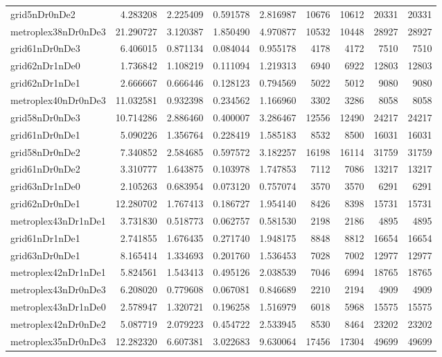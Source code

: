 \begin{longtable}{|l|r|r|r|r|r|r|r|r|}
grid5nDr0nDe2 & 4.283208 & 2.225409 & 0.591578 & 2.816987 & 10676 & 10612 & 20331 & 20331 \\
metroplex38nDr0nDe3 & 21.290727 & 3.120387 & 1.850490 & 4.970877 & 10532 & 10448 & 28927 & 28927 \\
grid61nDr0nDe3 & 6.406015 & 0.871134 & 0.084044 & 0.955178 & 4178 & 4172 & 7510 & 7510 \\
grid62nDr1nDe0 & 1.736842 & 1.108219 & 0.111094 & 1.219313 & 6940 & 6922 & 12803 & 12803 \\
grid62nDr1nDe1 & 2.666667 & 0.666446 & 0.128123 & 0.794569 & 5022 & 5012 & 9080 & 9080 \\
metroplex40nDr0nDe3 & 11.032581 & 0.932398 & 0.234562 & 1.166960 & 3302 & 3286 & 8058 & 8058 \\
grid58nDr0nDe3 & 10.714286 & 2.886460 & 0.400007 & 3.286467 & 12556 & 12490 & 24217 & 24217 \\
grid61nDr0nDe1 & 5.090226 & 1.356764 & 0.228419 & 1.585183 & 8532 & 8500 & 16031 & 16031 \\
grid58nDr0nDe2 & 7.340852 & 2.584685 & 0.597572 & 3.182257 & 16198 & 16114 & 31759 & 31759 \\
grid61nDr0nDe2 & 3.310777 & 1.643875 & 0.103978 & 1.747853 & 7112 & 7086 & 13217 & 13217 \\
grid63nDr1nDe0 & 2.105263 & 0.683954 & 0.073120 & 0.757074 & 3570 & 3570 & 6291 & 6291 \\
grid62nDr0nDe1 & 12.280702 & 1.767413 & 0.186727 & 1.954140 & 8426 & 8398 & 15731 & 15731 \\
metroplex43nDr1nDe1 & 3.731830 & 0.518773 & 0.062757 & 0.581530 & 2198 & 2186 & 4895 & 4895 \\
grid61nDr1nDe1 & 2.741855 & 1.676435 & 0.271740 & 1.948175 & 8848 & 8812 & 16654 & 16654 \\
grid63nDr0nDe1 & 8.165414 & 1.334693 & 0.201760 & 1.536453 & 7028 & 7002 & 12977 & 12977 \\
metroplex42nDr1nDe1 & 5.824561 & 1.543413 & 0.495126 & 2.038539 & 7046 & 6994 & 18765 & 18765 \\
metroplex43nDr0nDe3 & 6.208020 & 0.779608 & 0.067081 & 0.846689 & 2210 & 2194 & 4909 & 4909 \\
metroplex43nDr1nDe0 & 2.578947 & 1.320721 & 0.196258 & 1.516979 & 6018 & 5968 & 15575 & 15575 \\
metroplex42nDr0nDe2 & 5.087719 & 2.079223 & 0.454722 & 2.533945 & 8530 & 8464 & 23202 & 23202 \\
metroplex35nDr0nDe3 & 12.282320 & 6.607381 & 3.022683 & 9.630064 & 17456 & 17304 & 49699 & 49699 \\

\end{longtable}
